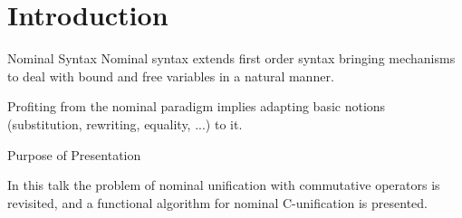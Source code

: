 \section{Introduction}

\begin{frame}{Nominal Syntax}
    Nominal syntax extends first order syntax bringing mechanisms to deal with bound
    and free variables in a natural manner.
    \par Profiting from the nominal paradigm implies adapting basic notions 
    (substitution, rewriting, equality, ...) to it.
\end{frame}

\begin{frame}{Purpose of Presentation}
    \par In this talk the problem of nominal unification with commutative operators
    is revisited, and a functional algorithm for nominal C-unification is presented. 
\end{frame}

